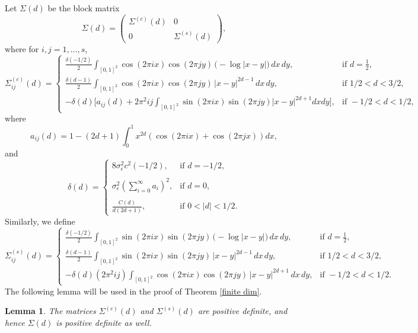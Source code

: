 \documentclass[12pt]{article}
\numberwithin{equation}{section}
\newtheorem{lem}{Lemma}[section]
\begin{document}
Let
$\Sigma(d)$ be the block matrix
\begin{equation}\label{Sigma}
\Sigma(d) =
\begin{pmatrix}
\Sigma^{(c)}(d) & 0\\[3pt]
0 &\Sigma^{(s)}(d)
\end{pmatrix},
\end{equation}
where for 
 $i,j=1,\ldots,s$, 
\[
\Sigma^{(c)}_{ij}(d) =
\begin{cases}
\displaystyle \frac{\delta(-1/2)}{2}\int_{[0,1]^2}\!\cos(2\pi i x)\cos(2\pi j y)\,
\bigl(-\log|x-y|\bigr)\,dx\,dy,
& \text{if } d=\tfrac{1}{2},\\[10pt]
\displaystyle\frac{\delta(d-1)}{2}\int_{[0,1]^2}\!\cos(2\pi i x)\cos(2\pi j y)\,
|x-y|^{2d-1}\,dx\,dy,
& \text{if } 1/2<d<3/2,\\[10pt]
-\delta(d)\Bigg[a_{ij}(d)+
2\pi^2 i j\displaystyle\int_{[0,1]^2}\sin(2\pi ix)\sin(2\pi jy)\vert x- y\vert^{2d+1}dxdy\Bigg], 
& \text{if } -1/2<d<1/2,
\end{cases}
\]
where
$$
a_{ij}(d)=1-(2d+1)\int_0^1x^{2d}\left(\cos(2\pi ix)+\cos(2\pi jx)\right)dx,
$$
and
\begin{equation}\label{const delta}
\delta(d)=\begin{cases}8\sigma^2_\epsilon c^2(-1/2),&\textrm{if }d=-1/2,\\\\
\sigma^2_\epsilon\left(\displaystyle\sum_{i=0}^\infty a_i\right)^2,&\textrm{if }d=0,\\\\
   \frac{C(d)}{d(2d+1)},&\textrm{if }0<\vert d\vert<1/2.
\end{cases}
\end{equation}
Similarly, we define
\[
\Sigma^{(s)}_{ij}(d) =
\begin{cases}
\displaystyle\frac{\delta(-1/2)}{2} \int_{[0,1]^2}\!\sin(2\pi i x)\sin(2\pi j y)\,
\bigl(-\log|x-y|\bigr)\,dx\,dy,
& \text{if } d=\tfrac{1}{2},\\[10pt]
\frac{\delta(d-1)}{2}\displaystyle\int_{[0,1]^2}\!\sin(2\pi i x)\sin(2\pi j y)\,
|x-y|^{2d-1}\,dx\,dy,
& \text{if } 1/2<d<3/2,\\[10pt]
-\delta(d)(2\pi^2 ij)\displaystyle\int_{[0,1]^2}\!\cos(2\pi i x)\cos(2\pi j y)\,
|x-y|^{2d+1}\,dx\,dy,
& \text{if } -1/2<d<1/2.
\end{cases}
\]
The following lemma will be used in the proof of Theorem \ref{finite dim}.
\begin{lem}\label{invertible}
The matrices $\Sigma^{(c)}(d)$ and $\Sigma^{(s)}(d)$ are positive definite, and hence $\Sigma(d)$ is positive definite as well. 
\end{lem}
\end{document}
